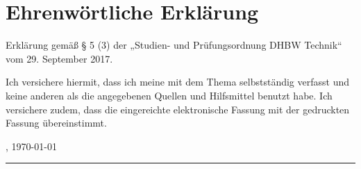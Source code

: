 \section*{Ehrenwörtliche Erklärung}

Erklärung gemäß § 5 (3) der „Studien- und Prüfungsordnung DHBW Technik“
vom 29. September 2017.

Ich versichere hiermit, dass ich meine \art\/ mit dem Thema
{\itshape{} \titel\/}
selbstständig verfasst und keine anderen als die angegebenen Quellen und Hilfsmittel benutzt habe.
Ich versichere zudem, dass die eingereichte elektronische Fassung mit der gedruckten Fassung übereinstimmt.


\vspace{3em}

\abgabeort, \today
\vspace{4em}

\rule{6cm}{0.4pt}\\
\autor
 
